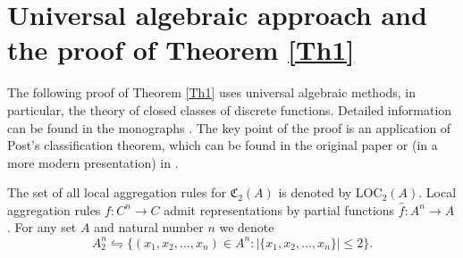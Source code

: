 \documentclass[graybox]{SNmult}
\theoremstyle{definition}
\begin{document}
\section{Universal algebraic approach and the proof of Theorem \ref{Th1}}
The following proof of Theorem \ref{Th1} uses universal algebraic methods, in particular, the theory of closed classes of discrete functions. Detailed information can be found in the monographs \cite{March, Lau, Poshel}. The key point of the proof is an application of Post's classification theorem, which can be found in the original paper \cite{Post} or (in a more modern presentation) in \cite{MarchBool, Zuk}.

\par The set of all local aggregation rules for $\mathfrak C_2(A)$ is denoted by $\mathrm{LOC}_2(A)$.  Local aggregation rules $f: C^n\to C$ admit representations by partial functions $\widehat f:A^n\to A$. For any set $A$ and natural number $n$ we denote
$$
A^n_2\leftrightharpoons \{(x_1, x_2, \ldots, x_n)\in A^n:|\{x_1, x_2, \ldots, x_n\}|\leq 2\}.
$$
\end{document}
